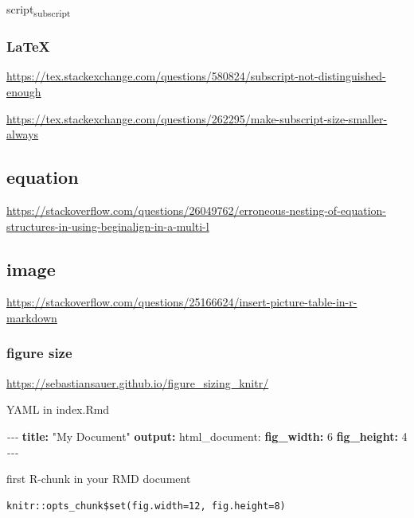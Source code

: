 \documentclass[
]{book}
\newenvironment{Shaded}{\begin{snugshade}}{\end{snugshade}}
\newcommand{\AttributeTok}[1]{\textcolor[rgb]{0.13,0.29,0.53}{#1}}
\newcommand{\DecValTok}[1]{\textcolor[rgb]{0.00,0.00,0.81}{#1}}
\newcommand{\FunctionTok}[1]{\textcolor[rgb]{0.13,0.29,0.53}{\textbf{#1}}}
\newcommand{\KeywordTok}[1]{\textcolor[rgb]{0.13,0.29,0.53}{\textbf{#1}}}
\newcommand{\PreprocessorTok}[1]{\textcolor[rgb]{0.56,0.35,0.01}{\textit{#1}}}
\newcommand{\StringTok}[1]{\textcolor[rgb]{0.31,0.60,0.02}{#1}}
\theoremstyle{definition}
\theoremstyle{definition}
\theoremstyle{definition}
\theoremstyle{definition}
\theoremstyle{remark}
\begin{document}
script\textsubscript{subscript}

\hypertarget{latex}{%
\subsubsection{LaTeX}\label{latex}}

\url{https://tex.stackexchange.com/questions/580824/subscript-not-distinguished-enough}

\url{https://tex.stackexchange.com/questions/262295/make-subscript-size-smaller-always}

\hypertarget{equation}{%
\subsection{equation}\label{equation}}

\url{https://stackoverflow.com/questions/26049762/erroneous-nesting-of-equation-structures-in-using-beginalign-in-a-multi-l}

\hypertarget{image}{%
\subsection{image}\label{image}}

\url{https://stackoverflow.com/questions/25166624/insert-picture-table-in-r-markdown}

\hypertarget{figure-size}{%
\subsubsection{figure size}\label{figure-size}}

\url{https://sebastiansauer.github.io/figure_sizing_knitr/}

YAML in index.Rmd

\begin{Shaded}
\begin{Highlighting}[]
\PreprocessorTok{{-}{-}{-} }
\FunctionTok{title}\KeywordTok{:}\AttributeTok{ }\StringTok{"My Document"}\AttributeTok{ }
\FunctionTok{output}\KeywordTok{:}\AttributeTok{ html\_document: }
\FunctionTok{fig\_width}\KeywordTok{:}\AttributeTok{ }\DecValTok{6}\AttributeTok{ }
\FunctionTok{fig\_height}\KeywordTok{:}\AttributeTok{ }\DecValTok{4}\AttributeTok{ }
\PreprocessorTok{{-}{-}{-} }
\end{Highlighting}
\end{Shaded}

first R-chunk in your RMD document

\begin{verbatim}
knitr::opts_chunk$set(fig.width=12, fig.height=8) 
\end{verbatim}
\end{document}
